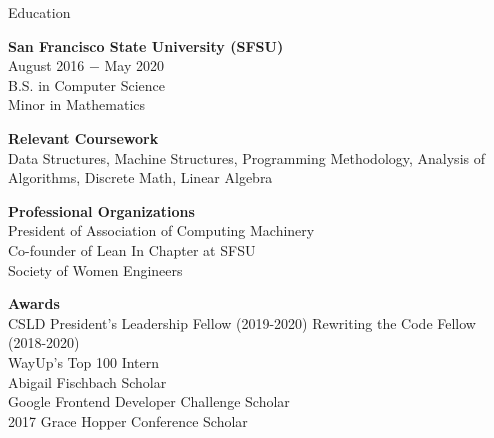 \documentclass{resume} %
\begin{document}

\begin{rSection}{Education}
\begin{multicols}{2}

{\bf San Francisco State University (SFSU)}\\
August 2016 $-$ May 2020\\
B.S. in Computer Science\\
Minor in Mathematics

{\bf Relevant Coursework}\\
Data Structures, 
Machine Structures,
Programming Methodology,
Analysis of Algorithms, 
Discrete Math,
Linear Algebra
\columnbreak

{\bf Professional Organizations}\\
President of Association of Computing Machinery\\
Co-founder of Lean In Chapter at SFSU\\
Society of Women Engineers

{\bf Awards}\\
CSLD President's Leadership Fellow (2019-2020)
Rewriting the Code Fellow (2018-2020)\\
WayUp's Top 100 Intern\\
Abigail Fischbach Scholar\\
Google Frontend Developer Challenge Scholar\\
2017 Grace Hopper Conference Scholar

\end{multicols}
\end{rSection}

\end{document}
